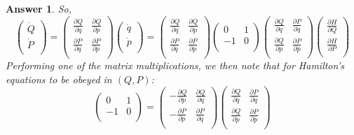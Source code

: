 \documentclass[a4paper]{article}
\newtheorem{ans}{Answer}[subsection]
\theoremstyle{new}
\begin{document}
\begin{ans}
So,
$$\begin{pmatrix}\dot{Q}\\\dot{P}\\\end{pmatrix}=\begin{pmatrix}\frac{\partial Q}{\partial q}&\frac{\partial Q}{\partial p}\\\frac{\partial P}{\partial q}&\frac{\partial P}{\partial p}\\\end{pmatrix}\begin{pmatrix}\dot{q}\\\dot{p}\\\end{pmatrix}=\begin{pmatrix}\frac{\partial Q}{\partial q}&\frac{\partial Q}{\partial p}\\\frac{\partial P}{\partial q}&\frac{\partial P}{\partial p}\\\end{pmatrix}\begin{pmatrix}0&1\\-1&0\\\end{pmatrix}\begin{pmatrix}\frac{\partial Q}{\partial q}&\frac{\partial P}{\partial q}\\\frac{\partial Q}{\partial p}&\frac{\partial P}{\partial p}\\\end{pmatrix}\begin{pmatrix}\frac{\partial H}{\partial Q}\\\frac{\partial H}{\partial P}\\\end{pmatrix}$$
Performing one of the matrix multiplications, we then note that for Hamilton's equations to be obeyed in $(Q,P)$:
$$\begin{pmatrix}0&1\\-1&0\\\end{pmatrix}=\begin{pmatrix}-\frac{\partial Q}{\partial p}&\frac{\partial Q}{\partial q}\\-\frac{\partial P}{\partial p}&\frac{\partial P}{\partial q}\\\end{pmatrix}\begin{pmatrix}\frac{\partial Q}{\partial q}&\frac{\partial P}{\partial q}\\\frac{\partial Q}{\partial p}&\frac{\partial P}{\partial p}\\\end{pmatrix}$$

\end{ans}
\end{document}
